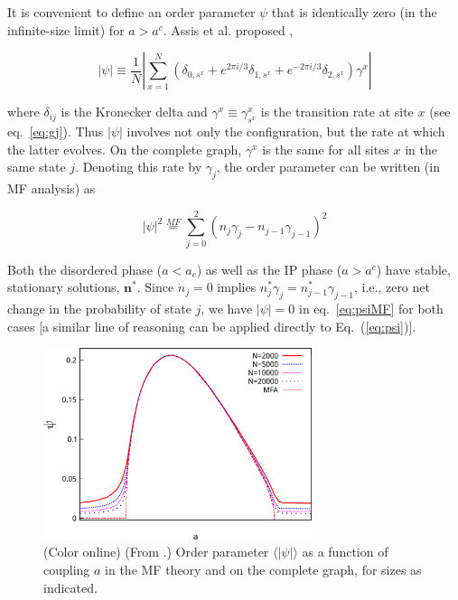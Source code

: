 It is convenient to define an order parameter $\psi$ that is identically zero (in the infinite-size limit) for $a>a^c$. Assis et al.
proposed \cite{assis2011infinite},
\vspace{1em}

\begin{equation}
    \label{eq:psi}
    |\psi| \equiv \frac{1}{N}\left| \sum_{x=1}^N \left( \delta_{0,s^x} + e^{2\pi i/3}\delta_{1,s^x} + e^{-2\pi i/3}\delta_{2,s^x} \right) \gamma^x \right|
\end{equation}
\vspace{1em}

\noindent where $\delta_{ij}$ is the Kronecker delta and $\gamma^x \equiv \gamma^x_{s^x}$ is the transition rate at site $x$ (see
eq.~\ref{eq:gj}). Thus $|\psi|$ involves not only the configuration, but the rate at which the latter evolves.  On the complete graph,
$\gamma^x$ is the same for all sites $x$ in the same state $j$. Denoting this rate by $\gamma_j$, the order parameter can be written
(in MF analysis) as

\begin{equation}
    \label{eq:psiMF}
    |\psi|^2 \stackrel{MF}{=} \sum_{j=0}^2 (n_j \gamma_j - n_{j-1} \gamma_{j-1})^2 
\end{equation}

\noindent Both the disordered phase ($a< a_c$) as well as the IP phase ($a>a^c$) have stable, stationary solutions, $\textbf{n}^*$.
Since $\dot{n}_j = 0$ implies $n^*_j\gamma_j = n^*_{j-1}\gamma_{j-1}$, i.e., zero net change in the probability of state $j$, we have
$|\psi|=0$ in eq.~\ref{eq:psiMF} for both cases [a similar line of reasoning can be applied directly to Eq.~(\ref{eq:psi})].

\begin{figure}
\begin{center}
    \includegraphics[width=0.7\textwidth]{fig/psivsa.eps}
    \caption{\label{fig:psi}
        (Color online) (From \cite{assis2011infinite}.) Order parameter $\langle
        |\psi| \rangle$ as a function of coupling $a$ in the MF theory and
        on the complete graph, for sizes as indicated.
    }
\end{center}
\end{figure}

